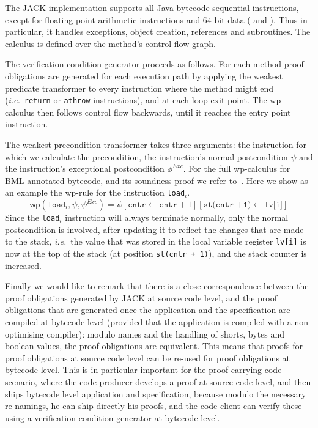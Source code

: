 The JACK implementation supports all Java bytecode sequential
instructions, except for floating point arithmetic instructions and 64
bit data ( and ). Thus in particular, it
handles exceptions, object creation, references and subroutines. The
calculus is defined over the method's control flow graph.


The verification condition generator proceeds as follows. For each
method proof obligations are generated for each execution path by
applying the weakest predicate transformer to every instruction where
the method might end (\emph{i.e.}\ \texttt{return} or \texttt{athrow}
instructions), and at each loop exit point. The wp-calculus then
follows control flow backwards, until it reaches the entry point
instruction.

The weakest precondition transformer takes three arguments: the
instruction for which we calculate the precondition, the instruction's
normal postcondition $\psi$ and the instruction's exceptional
postcondition $\phi^{\mathit{Exc}}$. For the full wp-calculus for
BML-annotated bytecode, and its soundness proof we refer
to~\cite{Pavlova:phd}. Here we show as an example the wp-rule for the
instruction \texttt{load\(_i\)}.
\[
\mathsf{wp}(\texttt{load}_i, \psi, \psi^{\mathit{Exc}})  = 
\psi[\texttt{cntr} \leftarrow \texttt{cntr} + 1][\texttt{st(cntr +1)}
\leftarrow \texttt{lv[i]}]
\]
Since the \texttt{load}\(_i\) instruction will always terminate
normally, only the normal postcondition is involved, after updating it
to reflect the changes that are made to the stack, \emph{i.e.}\ the
value that was stored in the local variable register \texttt{lv[i]} is
now at the top of the stack (at position \texttt{st(cntr + 1)}),  and 
the stack counter is increased.



Finally we would like to remark that there is a close correspondence
between the proof obligations generated by JACK at source code level,
and the proof obligations that are generated once the application and
the specification are compiled at bytecode level (provided that the
application is compiled with a non-optimising compiler): modulo names
and the handling of shorts, bytes and boolean values, the proof
obligations are equivalent. This means that proofs for proof
obligations at source code level can be re-used for proof obligations
at bytecode level. This is in particular important for the proof
carrying code scenario, where the code producer develops a proof at
source code level, and then ships bytecode level application and
specification, because modulo the necessary re-namings, he can ship
directly his proofs, and the code client can verify these using a
verification condition generator at bytecode level.


